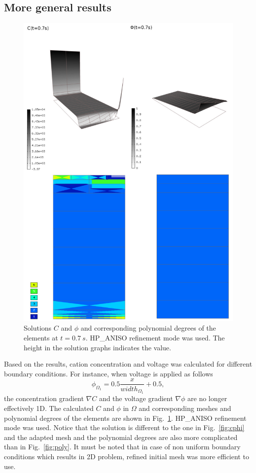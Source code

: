 \subsection{More general results}
\begin{figure}[!ht]
  \begin{centering}
  \includegraphics[width=.75\columnwidth]{cphiorders}
  \caption{\label{fig:cphi-orders} Solutions $C$ and $\phi$
  and corresponding polynomial degrees of the elements at
  $t=0.7\ s$. HP\_ANISO refinement mode was used. The height
  in the solution graphs indicates the value.}
  \end{centering}
\end{figure}

Based on the results, cation concentration and voltage was calculated
for different boundary conditions.
For instance, when voltage is applied as follows
\begin{equation}
  \phi_{\Omega_1}=0.5\frac{x}{width_{\Omega_1}}+0.5,
\end{equation}
the concentration gradient $\nabla C$ and the voltage gradient $\nabla \phi$ are no
longer effectively 1D.
The calculated $C$ and $\phi$ in $\Omega$ and corresponding meshes and polynomial
degrees of the elements are shown in Fig.~\ref{fig:cphi-orders}.
HP\_ANISO refinement mode was used. Notice that the solution
is different to the one in Fig.~\ref{fig:cphi} and the adapted mesh and the
polynomial degrees are also more complicated than in Fig.~\ref{fig:poly}.
It must be noted that in case of non uniform boundary conditions which
results in 2D problem, refined initial mesh was more efficient to use.
